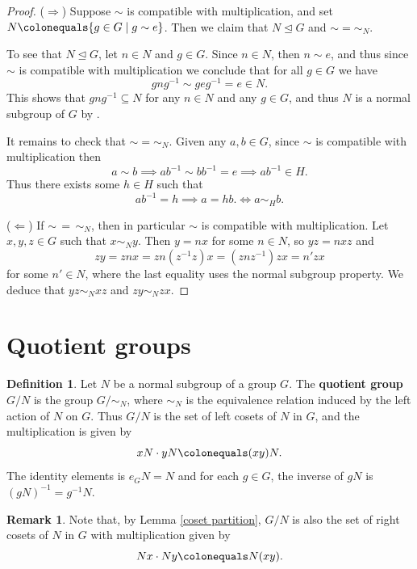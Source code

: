 \documentclass[12pt]{report}
\numberwithin{equation}{section}
\numberwithin{theorem}{chapter}
\theoremstyle{definition}
\newtheorem{definition}[theorem]{Definition}
\newtheorem*{basic properties}{Basic Properties}
\newtheorem*{Important Remark}{Important Remark}
\newtheorem{remark}[theorem]{Remark}
\newcommand{\df}[1]{{\bf #1}\index{#1}}
\def\norm{\mathrel{\unlhd}}
\begin{document}
\begin{proof}
($\Rightarrow$) Suppose $\sim$ is compatible with multiplication, and set $N \colonequals \{g \in G \mid g \sim e\}$. Then we claim that $N\norm G$ and $\sim=\sim_N$.

To see that $N\norm G$, let $n\in N$ and $g\in G$. Since $n\in N$, then $n \sim e$, and thus since $\sim$ is compatible with multiplication we conclude that for all $g \in G$ we have
$$gng^{-1}\sim geg^{-1} = e \in N.$$ 
This shows that $gng^{-1} \subseteq N$ for any $n \in N$ and any $g\in G$, and thus $N$ is a normal subgroup of $G$ by .

It remains to check that $\sim=\sim_N$. Given any $a, b \in G$, since $\sim$ is compatible with multiplication then
$$a \sim b \implies ab^{-1} \sim bb^{-1} = e \implies ab^{-1} \in H.$$
Thus there exists some $h \in H$ such that
$$ab^{-1} = h \implies a = hb. \iff a \sim_H b.$$

($\Leftarrow$) If $\sim \,=  \,\sim_N$, then in particular $\sim$ is compatible with multiplication. Let $x,y,z\in G$ such that $x\sim_N y$. Then $y=nx$ for some $n\in N$, so $yz=nxz$ and $$zy=znx=zn(z^{-1}z)x=(znz^{-1})zx=n'zx$$ 
 for some $n'\in N$, where the last equality uses the normal subgroup property. We deduce that $yz\sim_N xz$ and $zy\sim_N zx$.
\end{proof}


\section{Quotient groups}


\begin{definition}\label{$G/N$}
Let $N$ be a normal subgroup of a group $G$. The \df{quotient group} $G/N$ is the group $G/\sim_N$, where $\sim_N$ is the equivalence relation induced by the left action of $N$ on $G$. Thus $G/N$ is the set of left cosets of $N$ in $G$, and the multiplication is given by 
$$xN\cdot yN \colonequals (xy)N.$$ 
The identity elements is $e_GN = N$ and for each $g \in G$, the inverse of $gN$ is $(gN)^{-1} = g^{-1}N$.
\end{definition}

\begin{remark}
	Note that, by  Lemma \ref{coset partition}, $G/N$ is also the set of right  cosets of $N$ in $G$ with multiplication given by 
	$$Nx\cdot Ny \colonequals N(xy).$$
\end{remark}
\end{document}
